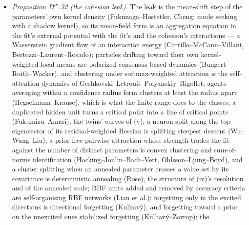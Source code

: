 \begin{itemize}
    constant-gain stochastic approximation from its own fluctuation (Benveniste--M\'etivier--Priouret;
    Dieuleveut--Durmus--Bach for constant-step SGD; Box's curvature bias of nonlinear least squares: \cite{S57}); what
    is added is its quantification here --- small in absolute terms ($\le3.9\cdot10^{-4}$ per $(\E\nu^2)^2$),
    $-8.7\%$ to $+3.3\%$ of DR's and DR*'s biases and $+56\%$ of DR's at $k_e = B = 100$, where DR's noise part
    nearly cancels; its own response falling like $k_e^{-2}$ on the one-dimensional reference, where the law's
    leading term averages out --- and the observation that the desired regressor does not remove it. Numerics:
    . Verdict: classical ingredients; a structural reading of the adaptive prior and a
    quantified, partial remedy for the transport leaks.
  \item \emph{Proposition D$'''$.32 (the cohesion leak).} The leak is the mean-shift step of the parameters' own
    kernel density (Fukunaga--Hostetler, Cheng: mode seeking with a shadow kernel), so its mean-field form is an
    aggregation equation in the fit's external potential with the fit's and the cohesion's interactions --- a
    Wasserstein gradient flow of an interaction energy (Carrillo--McCann--Villani, Bertozzi--Laurent--Rosado);
    particles drifting toward their own kernel-weighted local means are polarized consensus-based dynamics
    (Bungert--Roith--Wacker), and clustering under softmax-weighted attraction is the self-attention dynamics of
    Geshkovski--Letrouit--Polyanskiy--Rigollet; agents averaging within a confidence radius form clusters at least the
    radius apart (Hegselmann--Krause), which is what the finite range does to the classes; a duplicated hidden unit
    turns a critical point into a line of critical points (Fukumizu--Amari), the twins' curves of (v); a neuron split
    along the top eigenvector of its residual-weighted Hessian is splitting steepest descent (Wu--Wang--Liu); a
    prior-free pairwise attraction whose strength trades the fit against the number of distinct parameters is convex
    clustering and sum-of-norms identification (Hocking--Joulin--Bach--Vert, Ohlsson--Ljung--Boyd), and a cluster
    splitting when an annealed parameter crosses a value set by its covariance is deterministic annealing (Rose), the
    structure of (iv)'s resolution and of the annealed scale; RBF units added and removed by accuracy criteria are
    self-organising RBF networks (Lian et al.); forgetting only in the excited directions is directional forgetting
    (Kulhav\'y), and forgetting toward a prior on the unexcited ones stabilized forgetting (Kulhav\'y--Zarrop); the

\end{itemize}
